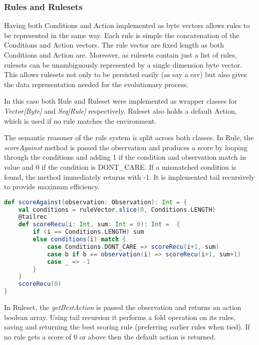 \subsubsection{Rules and Rulesets}

Having both Conditions and Action implemented as byte vectors allows rules to be represented in the same way. Each rule is simple the concatenation of the Conditions and Action vectors. The rule vector are fixed length as both Conditions and Action are. Moreover, as rulesets contain just a list of rules, rulesets can be unambiguously represented by a single dimension byte vector. This allows rulesets not only to be persisted easily (as say a csv) but also gives the data representation needed for the evolutionary process.

In this case both Rule and Ruleset were implemented as wrapper classes for \emph{Vector[Byte]} and \emph{Seq[Rule]} respectively. Ruleset also holds a default Action, which is used if no rule matches the environment.

The semantic reasoner of the rule system is split across both classes. In Rule, the \emph{scoreAgainst} method is passed the observation and produces a score by looping through the conditions and adding 1 if the condition and observation match in value and 0 if the condition is {\footnotesize DONT\_CARE}. If a mismatched condition is found, the method immediately returns with -1. It is implemented tail recursively to provide maximum efficiency.

\begin{minipage}{0.9\linewidth}
\centering
\begin{lstlisting}[language=scala]
def scoreAgainst(observation: Observation): Int = {
    val conditions = ruleVector.slice(0, Conditions.LENGTH)
    @tailrec
    def scoreRecu(i: Int, sum: Int = 0): Int =  {
        if (i == Conditions.LENGTH) sum
        else conditions(i) match {
            case Conditions.DONT_CARE => scoreRecu(i+1, sum)
            case b if b == observation(i) => scoreRecu(i+1, sum+1)
            case _ => -1
        }
    }
    scoreRecu(0)
}
\end{lstlisting}
\end{minipage}

In Ruleset, the \emph{getBestAction} is passed the observation and returns an action boolean array. Using tail recursion it performs a fold operation on its rules, saving and returning the best scoring rule (preferring earlier rules when tied). If no rule gets a score of 0 or above then the default action is returned.

